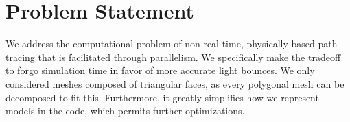 \documentclass[../main.tex]{subfiles}
\begin{document}
\section{Problem Statement}

We address the computational problem of non-real-time, physically-based path
tracing that is facilitated through parallelism. We specifically make the
tradeoff to forgo simulation time in favor of more accurate light bounces. We
only considered meshes composed of triangular faces, as every polygonal mesh
can be decomposed to fit this. Furthermore, it greatly simplifies how we
represent models in the code, which permits further optimizations.

\ifSubfilesClassLoaded{%
    \nocite{*}
    \twocolumn
}{}
\end{document}
